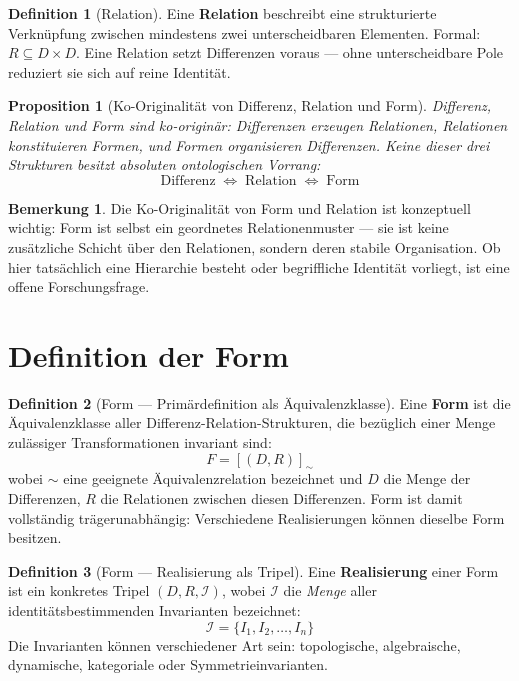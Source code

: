 \documentclass[11pt,a4paper]{article}
\theoremstyle{plain}
\newtheorem{proposition}{Proposition}[section]
\theoremstyle{definition}
\newtheorem{definition}{Definition}[section]
\newtheorem{remark}{Bemerkung}[section]
\begin{document}
\begin{definition}[Relation]
Eine \textbf{Relation} beschreibt eine strukturierte Verkn\"{u}pfung zwischen
mindestens zwei unterscheidbaren Elementen. Formal: $R \subseteq D \times D$.
Eine Relation setzt Differenzen voraus --- ohne unterscheidbare Pole reduziert sie
sich auf reine Identit\"{a}t.
\end{definition}

\begin{proposition}[Ko-Originalit\"{a}t von Differenz, Relation und Form]
Differenz, Relation und Form sind ko-origin\"{a}r: Differenzen erzeugen Relationen,
Relationen konstituieren Formen, und Formen organisieren Differenzen. Keine dieser
drei Strukturen besitzt absoluten ontologischen Vorrang:
\[
  \boxed{\text{Differenz} \;\Longleftrightarrow\; \text{Relation}
  \;\Longleftrightarrow\; \text{Form}}
\]
\end{proposition}

\begin{remark}
Die Ko-Originalit\"{a}t von Form und Relation ist konzeptuell wichtig: Form ist
selbst ein geordnetes Relationenmuster --- sie ist keine zus\"{a}tzliche Schicht
\"{u}ber den Relationen, sondern deren stabile Organisation. Ob hier tats\"{a}chlich
eine Hierarchie besteht oder begriffliche Identit\"{a}t vorliegt, ist eine offene
Forschungsfrage.
\end{remark}

\section{Definition der Form}

\begin{definition}[Form --- Prim\"{a}rdefinition als \"{A}quivalenzklasse]
Eine \textbf{Form} ist die \"{A}quivalenzklasse aller Differenz-Relation-Strukturen,
die bez\"{u}glich einer Menge zul\"{a}ssiger Transformationen invariant sind:
\[
  F = [(D, R)]_{\sim}
\]
wobei $\sim$ eine geeignete \"{A}quivalenzrelation bezeichnet und $D$ die Menge der
Differenzen, $R$ die Relationen zwischen diesen Differenzen. Form ist damit vollst\"{a}ndig
tr\"{a}gerunabh\"{a}ngig: Verschiedene Realisierungen k\"{o}nnen dieselbe Form besitzen.
\end{definition}

\begin{definition}[Form --- Realisierung als Tripel]
Eine \textbf{Realisierung} einer Form ist ein konkretes Tripel $(D, R, \mathcal{I})$,
wobei $\mathcal{I}$ die \emph{Menge} aller identit\"{a}tsbestimmenden Invarianten
bezeichnet:
\[
  \mathcal{I} = \{I_1, I_2, \ldots, I_n\}
\]
Die Invarianten k\"{o}nnen verschiedener Art sein: topologische, algebraische,
dynamische, kategoriale oder Symmetrieinvarianten.
\end{definition}
\end{document}
